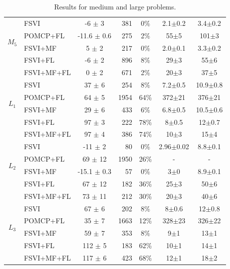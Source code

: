 \documentclass[letterpaper]{article}
\newcommand{\itay}[1]{}
\begin{document}
\begin{table}
{\begin{tabular}{ |c|l|c|r|c|c|c| }
\hline\hline
\multirow{4}{*}{$M_5$}
& FSVI\itay{+} & -6 $\pm$ 3 & 381 & 0\% & 2.1$\pm$0.2 & 3.4$\pm$0.2 \\
& POMCP+FL\itay{+} & -11.6 $\pm$ 0.6 & 275 & 2\% & 55$\pm$5 & 101$\pm$3 \\
& FSVI+MF\itay{+} & 5 $\pm$ 2 & 217 & 0\% & 2.0$\pm$0.1 & 3.3$\pm$0.2 \\
&FSVI+FL\itay{+} & -6 $\pm$ 2 & 896 & 8\% & 29$\pm$3 & 55$\pm$6 \\
& FSVI+MF+FL\itay{+} & 0 $\pm$ 2 & 671 & 2\% & 20$\pm$3 & 37$\pm$5 \\
\hline\hline
\multirow{4}{*}{$L_1$}
& FSVI\itay{+} & 37 $\pm$ 6 & 254 & 8\% &  7.2$\pm$0.5 & 10.9$\pm$0.8 \\
& POMCP+FL\itay{+} & 64 $\pm$ 5 & 1954 & 64\% &  372$\pm$21 & 376$\pm$21 \\
& FSVI+MF\itay{+} & 29 $\pm$ 6 & 433 & 6\% &  6.8$\pm$0.5 & 10.5$\pm$0.6 \\
&FSVI+FL\itay{+} & 97 $\pm$ 3 & 222 & 78\% &  8$\pm$0.5 & 12$\pm$0.7 \\
& FSVI+MF+FL\itay{+} & 97 $\pm$ 4 & 386 & 74\% &  10$\pm$3 & 15$\pm$4 \\
\hline\hline
\multirow{4}{*}{$L_2$}
& FSVI\itay{+} & -11 $\pm$ 2 & 80 & 0\% &  2.96$\pm$0.02 & 8.8$\pm$0.1 \\
& POMCP+FL\itay{-} & 69 $\pm$ 12 & 1950 & 26\% &  - & - \\
& FSVI+MF\itay{+} & -15.1 $\pm$ 0.3 & 57 & 0\% &  3$\pm$0 & 8.9$\pm$0.1 \\
&FSVI+FL\itay{+} & 67 $\pm$ 12 & 182 & 36\% &  25$\pm$3 & 50$\pm$6 \\
& FSVI+MF+FL\itay{+} & 73 $\pm$ 11 & 212 & 30\% & 20$\pm$3 & 40$\pm$6 \\
\hline \hline
\multirow{4}{*}{$L_3$}
& FSVI\itay{+} & 67 $\pm$ 6 & 202 & 8\% & 8$\pm$0.6 & 12$\pm$0.8 \\
& POMCP+FL\itay{+} & 35 $\pm$ 7 & 1663 & 12\% & 328$\pm$23 & 326$\pm$22 \\
& FSVI+MF\itay{+} & 59 $\pm$ 7 & 353 & 8\% & 9$\pm$1 & 13$\pm$1 \\
&FSVI+FL\itay{+} & 112 $\pm$ 5 & 183 & 62\% & 10$\pm$1 & 14$\pm$1 \\
& FSVI+MF+FL\itay{+} & 117 $\pm$ 6 & 423 & 68\% & 12$\pm$1 & 18$\pm$2 \\
\hline
\end{tabular}
}
\caption{Results for medium and large problems.}%
\label{tab:large-results}
\end{table}
\end{document}

